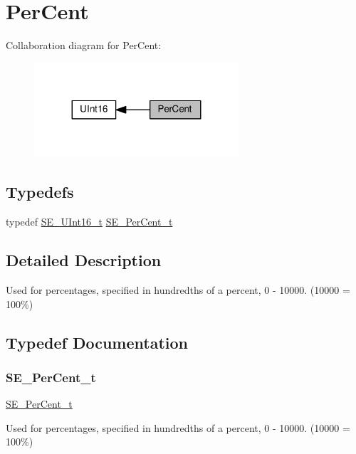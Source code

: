\hypertarget{group__PerCent}{}\section{Per\+Cent}
\label{group__PerCent}
Collaboration diagram for Per\+Cent\+:\nopagebreak
\begin{figure}[H]
\begin{center}
\leavevmode
\includegraphics[width=215pt]{group__PerCent}
\end{center}
\end{figure}
\subsection*{Typedefs}
\begin{DoxyCompactItemize}
\item 
typedef \hyperlink{group__UInt16_gac68d541f189538bfd30cfaa712d20d29}{S\+E\+\_\+\+U\+Int16\+\_\+t} \hyperlink{group__PerCent_ga14278cbee754c63496035b722b417ddc}{S\+E\+\_\+\+Per\+Cent\+\_\+t}
\end{DoxyCompactItemize}


\subsection{Detailed Description}
Used for percentages, specified in hundredths of a percent, 0 -\/ 10000. (10000 = 100\%) 

\subsection{Typedef Documentation}
\mbox{\label{group__PerCent_ga14278cbee754c63496035b722b417ddc}} 
\subsubsection{\texorpdfstring{S\+E\+\_\+\+Per\+Cent\+\_\+t}{SE\_PerCent\_t}}
{\footnotesize\ttfamily \hyperlink{group__PerCent_ga14278cbee754c63496035b722b417ddc}{S\+E\+\_\+\+Per\+Cent\+\_\+t}}

Used for percentages, specified in hundredths of a percent, 0 -\/ 10000. (10000 = 100\%) 